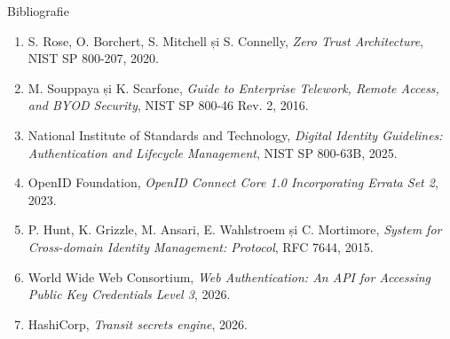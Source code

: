 \documentclass[aspectratio=169,12pt]{beamer}
\begin{document}
\begin{frame}{Bibliografie}
\vspace{0.14cm}
{%
\fontsize{8.7}{10.2}\selectfont
\begin{enumerate}
  \setlength{\itemsep}{0.15cm}
  \item S. Rose, O. Borchert, S. Mitchell și S. Connelly, \textit{Zero Trust Architecture}, NIST SP 800-207, 2020.
  \item M. Souppaya și K. Scarfone, \textit{Guide to Enterprise Telework, Remote Access, and BYOD Security}, NIST SP 800-46 Rev. 2, 2016.
  \item National Institute of Standards and Technology, \textit{Digital Identity Guidelines: Authentication and Lifecycle Management}, NIST SP 800-63B, 2025.
  \item OpenID Foundation, \textit{OpenID Connect Core 1.0 Incorporating Errata Set 2}, 2023.
  \item P. Hunt, K. Grizzle, M. Ansari, E. Wahlstroem și C. Mortimore, \textit{System for Cross-domain Identity Management: Protocol}, RFC 7644, 2015.
  \item World Wide Web Consortium, \textit{Web Authentication: An API for Accessing Public Key Credentials Level 3}, 2026.
  \item HashiCorp, \textit{Transit secrets engine}, 2026.
\end{enumerate}
}
\end{frame}
\end{document}
